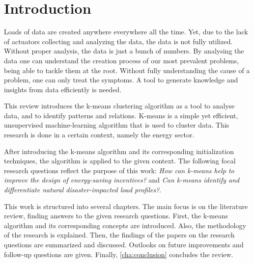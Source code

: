 \chapter{Introduction}
\label{cha:introduction}


Loads of data are created anywhere everywhere all the time.
Yet, due to the lack of actuators collecting and analyzing the data, the data is not fully utilized.
Without proper analysis, the data is just a bunch of numbers.
By analysing the data one can understand the creation process of our most prevalent problems, being able to tackle them at the root.
Without fully understanding the cause of a problem, one can only treat the symptoms.
A tool to generate knowledge and insights from data efficiently is needed.

This review introduces the k-means clustering algorithm as a tool to analyse data, and to identify patterns and relations.
K-means is a simple yet efficient, unsupervised machine-learning algorithm that is used to cluster data.
This research is done in a certain context, namely the energy sector.

After introducing the k-means algorithm and its corresponding initialization techniques, the algorithm is applied to the given context.
The following focal research questions reflect the purpose of this work:
\textit{How can k-means help to improve the design of energy-saving incentives?} and \textit{Can k-means identify and differentiate natural disaster-impacted load profiles?}.

This work is structured into several chapters.
The main focus is on the literature review, finding answers to the given research questions.
First, the k-means algorithm and its corresponding concepts are introduced.
Also, the methodology of the research is explained.
Then, the findings of the papers on the research questions are summarized and discussed.
Outlooks on future improvements and follow-up questions are given.
Finally, \autoref{cha:conclusion} concludes the review.
